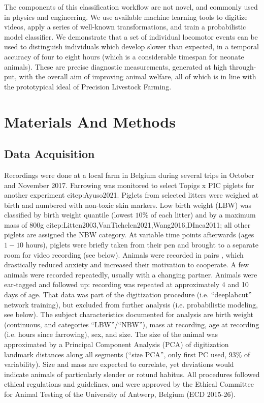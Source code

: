 The components of this classification workflow are not novel, and commonly used in physics and engineering.
We use available machine learning tools to digitize videos, apply a series of well-known transformations, and train a probabilistic model classifier.
We demonstrate that a set of individual locomotor events can be used to distinguish individuals which develop slower than expected, in a temporal accuracy of four to eight hours (which is a considerable timespan for neonate animals).
These are precise diagnostic measurements, generated at high through-put, with the overall aim of improving animal welfare, all of which is in line with the prototypical ideal of Precision Livestock Farming.


\FloatBarrier
\clearpage
\section{Materials And Methods}
\label{methods}

\subsection{Data Acquisition}
\label{sec:orgd0bae22}

Recordings were done at a local farm in Belgium during several trips in October and November 2017.
Farrowing was monitored to select Topigs x PIC piglets for another experiment citep:Ayuso2021.
Piglets from selected litters were weighed at birth and numbered with non-toxic skin markers.
Low birth weight (LBW) was classified by birth weight quantile (lowest \(10 \%\) of each litter) and by a maximum mass of \(800\)g citep:Litten2003,VanTichelen2021,Wang2016,DInca2011; all other piglets are assigned the NBW category.
At variable time points afterwards (ages \(1 - 10\) hours), piglets were briefly taken from their pen and brought to a separate room for video recording (see below).
Animals were recorded in pairs \citep[as in][]{Mielke2018}, which drastically reduced anxiety and increased their motivation to cooperate.
A few animals were recorded repeatedly, usually with a changing partner.
Animals were ear-tagged and followed up: recording was repeated at approximately 4 and 10 days of age.
That data was part of the digitization procedure (i.e. ``deeplabcut'' network training), but excluded from further analysis (i.e. probabilistic modeling, see below).
The subject characteristics documented for analysis are birth weight (continuous, and categories ``LBW''/``NBW''), mass at recording, age at recording (i.e. hours since farrowing), sex, and size.
The size of the animal was approximated by a Principal Component Analysis (PCA) of digitization landmark distances along all segments (``size PCA'', only first PC used,
\(93 \%\)
of variability).
Size and mass are expected to correlate, yet deviations would indicate animals of particularly slender or rotund habitus.
All procedures followed ethical regulations and guidelines, and were approved by the Ethical Committee for Animal Testing of the University of Antwerp, Belgium (ECD 2015-26).



